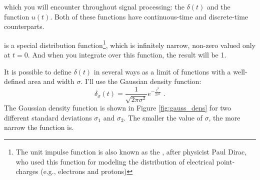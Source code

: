 %
% 
%
 which you will encounter
throughout signal processing: the \emph{} $\delta(t)$
and the \emph{} function $u(t)$. Both of these
functions have continuous-time and discrete-time counterparts.

 is a special distribution
function\footnote{The unit impulse function is also known as the
  \emph{}, after physicist Paul Dirac,
  who used this function for modeling the distribution of electrical point-charges (e.g., electrons and protons)},
which is infinitely narrow, non-zero valued only at $t=0$.
And when you integrate over this function, the result will be 1.

It is possible to define $\delta(t)$ in several ways as a limit of functions with a well-defined area and width $\sigma$.
I'll use the Gaussian density function:
\begin{equation}
  \delta_\sigma(t) = \frac{1}{\sqrt{2\pi \sigma^2}}e^{-\frac{t^2}{2\sigma^2}}\,\,.
\end{equation}
The Gaussian density function is shown in Figure \ref{fig:gauss_dens} for
two different standard deviations $\sigma_1$ and $\sigma_2$.
The smaller the value of $\sigma$, the more narrow the function is.

